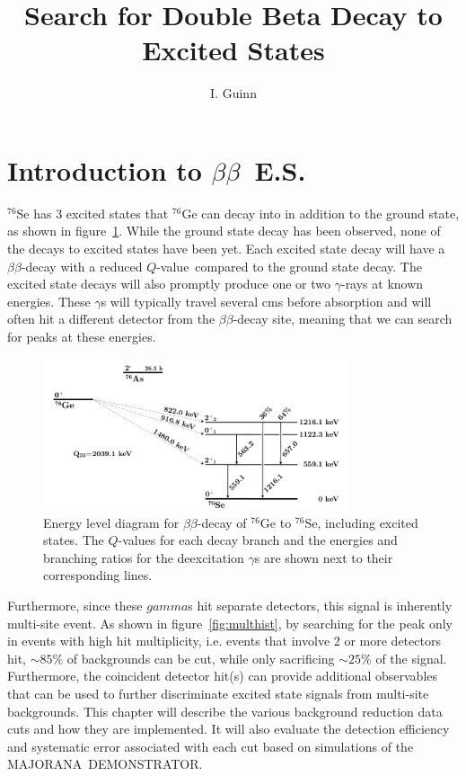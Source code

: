 \documentclass[notitlepage,rmp,aps,10pt]{revtex4-1}
\newcommand{\MJ}{M{\footnotesize AJORANA}}
\newcommand{\Demo}{D{\footnotesize EMON\-STRAT\-OR}}
\newcommand{\MJD}{\MJ\ \Demo}
\newcommand{\bb}{${\beta \beta}$}
\newcommand{\bbes}{\bb~E.S.}
\newcommand{\Qval}{$Q$-value}
\newcommand{\iso}[2]{$^{#1}$#2}
\newcommand{\Ge}[1]{\iso{#1}{Ge}}
\newcommand{\Se}[1]{\iso{#1}{Se}}
\newcommand{\msmd}{multi-site event}
\begin{document}
\graphicspath{{./pics/}{../ch3/pics/}{../ch4/pics/}{../ch5/pics/}{../appAllResults/pics/}}

\title{Search for Double Beta Decay to Excited States}
\author{I. Guinn}

\pagestyle{uniheader}
\maketitle
\vspace*{-1.5cm}
\tableofcontents
\thispagestyle{uniheader}


\section{Introduction to \bbes}
\Se{76} has 3 excited states that \Ge{76} can decay into in addition to the ground state, as shown in figure~\ref{fig:Ge76BBLevelDiagram}.
While the ground state decay has been observed, none of the decays to excited states have been yet.
Each excited state decay will have a \bb -decay with a reduced \Qval\ compared to the ground state decay.
The excited state decays will also promptly produce one or two $\gamma$-rays at known energies.
These $\gamma$s will typically travel several cms before absorption and will often hit a different detector from the \bb -decay site, meaning that we can search for peaks at these energies.
\\
\begin{figure}[h]
  \centering
  \includegraphics[width=0.8\textwidth]{leveldiagram}
  \caption[Energy level diagram for \Ge{76} \bb to \Se{76}]{\label{fig:Ge76BBLevelDiagram}
    Energy level diagram for \bb-decay of \Ge{76} to \Se{76}, including excited states. The \Qval s for each decay branch and the energies and branching ratios for the deexcitation $\gamma$s are shown next to their corresponding lines.}
\end{figure}


Furthermore, since these $gamma$s hit separate detectors, this signal is inherently \msmd.
As shown in figure~\ref{fig:multhist}, by searching for the peak only in events with high hit multiplicity, i.e. events that involve 2 or more detectors hit, $\sim85\%$ of backgrounds can be cut, while only sacrificing $\sim25$\% of the signal.
Furthermore, the coincident detector hit(s) can provide additional observables that can be used to further discriminate excited state signals from multi-site backgrounds.
This chapter will describe the various background reduction data cuts and how they are implemented.
It will also evaluate the detection efficiency and systematic error associated with each cut based on simulations of the \MJD.
\end{document}
